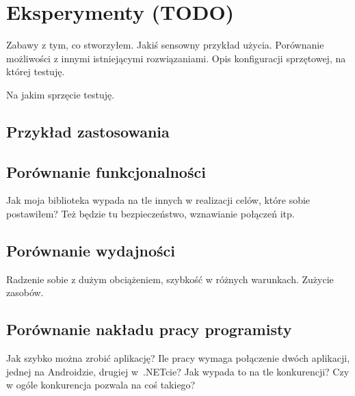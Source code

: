 \chapter{Eksperymenty (TODO)}
Zabawy z tym, co stworzyłem. Jakiś sensowny przykład użycia. Porównanie możliwości z innymi istniejącymi rozwiązaniami. Opis konfiguracji sprzętowej, na której testuję.

%
%
%

Na jakim sprzęcie testuję.

\section{Przykład zastosowania}

\section{Porównanie funkcjonalności}
Jak moja biblioteka wypada na tle innych w realizacji celów, które sobie postawiłem? Też będzie tu bezpieczeństwo, wznawianie połączeń itp.

\section{Porównanie wydajności}
Radzenie sobie z dużym obciążeniem, szybkość w różnych warunkach. Zużycie zasobów.

\section{Porównanie nakładu pracy programisty}
Jak szybko można zrobić aplikację? Ile pracy wymaga połączenie dwóch aplikacji, jednej na Androidzie, drugiej w~.NETcie? Jak wypada to na tle konkurencji? Czy w ogóle konkurencja pozwala na coś takiego?